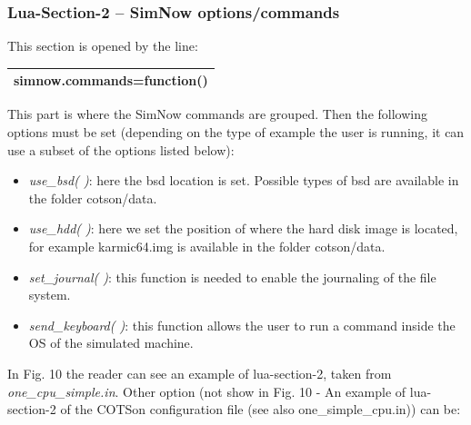 \documentclass[a4paper]{article}
\begin{document}
\subsubsection[Lua{}-Section{}-2 {}-- SimNow
options/commands]{\foreignlanguage{english}{\textrm{Lua-}}\textrm{S}\foreignlanguage{english}{\textrm{ection-}}\textrm{2}\foreignlanguage{english}{\textrm{
}}\foreignlanguage{english}{\textrm{{}--
}}\foreignlanguage{english}{\textrm{SimNow options/commands}}}
{
This section is opened by the line:}

\begin{flushleft}
\tablehead{}
\begin{supertabular}{|m{6.29346in}|}
\hline
{}\ttfamily simnow.commands=function()\\\hline
\end{supertabular}
\end{flushleft}
{
This part is where the SimNow commands are grouped. Then the following
options must be set (depending on the type of example the user is
running, it can use a subset of the options listed below):}

\begin{itemize}
\item {
\textit{use\_bsd( )}: here the bsd location is set. Possible types of
bsd are available in the folder cotson/data.}
\item {
\textit{use\_hdd( )}: here we set the position of where the hard disk
image is located, for example karmic64.img is available in the folder
cotson/data.}
\item {
\textit{set\_journal( )}: this function is needed to enable the
journaling of the file system.}
\item {
\textit{send\_keyboard( )}: this function allows the user to run a
command inside the OS of the simulated machine.}
\end{itemize}
{
In Fig. 10 the reader can see an example of lua-section-2, taken from
\textit{one\_cpu\_simple.in}. Other option (not show in Fig. 10 - An
example of lua-section-2 of the COTSon configuration file (see also
one\_simple\_cpu.in)) can be:}
\end{document}
